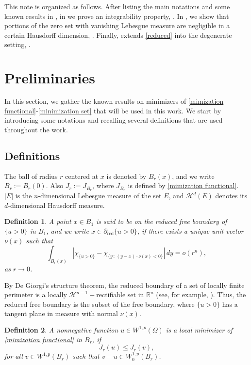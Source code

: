 \documentclass[11pt, reqno]{amsart}
\newtheorem{definition}{Definition}
\numberwithin{equation}{section}
\numberwithin{theorem}{section}
\numberwithin{lemma}{section}
\numberwithin{corollary}{section}
\numberwithin{remark}{section}
\numberwithin{proposition}{section}
\numberwithin{definition}{section}
\newcommand{\R}{\mathbb{R}}
\def \H {\mathcal{H}^{n-1}}
\newcommand{\reduced}{\operatorname{red}}
\begin{document}
\vspace{0.2cm}

This note is organized as follows. After listing the main notations and some known results in , in  we prove an integrability property, . In , we show that portions of the zero set with vanishing Lebesgue measure are negligible in a certain Hausdorff dimension, . Finally,  extends \eqref{reduced} into the degenerate setting, . 

\section{Preliminaries}\label{s2}
In this section, we gather the known results on minimizers of \eqref{mimization functional}-\eqref{minimization set} that will be used in this work. We start by introducing some notations and recalling several definitions that are used throughout the work.
\subsection{Definitions}
The ball of radius $r$ centered at $x$ is denoted by $B_r(x)$, and we write $B_r:=B_r(0)$. Also $J_r:=J_{B_r}$, where $J_{B_r}$ is defined by \eqref{mimization functional}. $|E|$ is the $n$-dimensional Lebesgue measure of the set $E$, and $\mathcal{H}^d(E)$ denotes its $d$-dimensional Hausdorff measure.
\begin{definition}\label{reduced free boundary}
    A point $x\in B_1$ is said to be on the \textit{reduced} free boundary of $\{u>0\}$ in $B_1$, and we write $x\in\partial_{\reduced}\{u>0\}$, if there exists a unique unit vector $\nu(x)$ such that
    $$
    \int_{B_r(x)}\left|\chi_{\{u>0\}}-\chi_{ \{ y \, : \, (y-x)\cdot\nu(x)<0 \} } \right| \, dy = o(r^n),
    $$
    as $r\to0$.   
\end{definition}
By De Giorgi's structure theorem, the reduced boundary of a set of locally finite perimeter is a locally $\H-$rectifiable set in $\R^n$ (see, for example, \cite[Corollary 16.1]{M12}). Thus, the reduced free boundary is the subset of the free boundary, where $\{u>0\}$ has a tangent plane in measure with normal $\nu(x)$.
\begin{definition}\label{localminimizer}
A nonnegative function $u\in W^{1,p}(\Omega)$ is a local minimizer of \eqref{mimization functional} in $B_r$, if
$$
J_r(u)\le J_r(v),
$$
for all $v\in W^{1,p}(B_r)$ such that $v-u\in W_0^{1,p}(B_r)$.
\end{definition}
\end{document}
